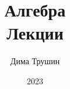 \documentclass{article}
\begin{document}
\title{Алгебра\\Лекции}
\author{Дима Трушин}
\date{2023}
	
\maketitle
\tableofcontents











\end{document}
